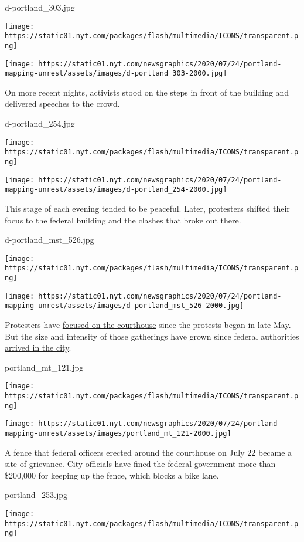 d-portland\_303.jpg

\texttt{[image: https://static01.nyt.com/packages/flash/multimedia/ICONS/transparent.png]}

\texttt{[image: https://static01.nyt.com/newsgraphics/2020/07/24/portland-mapping-unrest/assets/images/d-portland\_303-2000.jpg]}

On more recent nights, activists stood on the steps in front of the
building and delivered speeches to the crowd.

d-portland\_254.jpg

\texttt{[image: https://static01.nyt.com/packages/flash/multimedia/ICONS/transparent.png]}

\texttt{[image: https://static01.nyt.com/newsgraphics/2020/07/24/portland-mapping-unrest/assets/images/d-portland\_254-2000.jpg]}

This stage of each evening tended to be peaceful. Later, protesters
shifted their focus to the federal building and the clashes that broke
out there.

d-portland\_mst\_526.jpg

\texttt{[image: https://static01.nyt.com/packages/flash/multimedia/ICONS/transparent.png]}

\texttt{[image: https://static01.nyt.com/newsgraphics/2020/07/24/portland-mapping-unrest/assets/images/d-portland\_mst\_526-2000.jpg]}

Protesters have
\href{https://www.youtube.com/watch?v=s1FnOvg62O0}{focused on the
courthouse} since the protests began in late May. But the size and
intensity of those gatherings have grown since federal authorities
\href{https://www.nytimes.com/2020/07/17/us/portland-protests.html}{arrived
in the city}.

portland\_mt\_121.jpg

\texttt{[image: https://static01.nyt.com/packages/flash/multimedia/ICONS/transparent.png]}

\texttt{[image: https://static01.nyt.com/newsgraphics/2020/07/24/portland-mapping-unrest/assets/images/portland\_mt\_121-2000.jpg]}

A fence that federal officers erected around the courthouse on July 22
became a site of grievance. City officials have
\href{https://twitter.com/ChloeEudalyPDX/status/1288163839037456385}{fined
the federal government} more than \$200,000 for keeping up the fence,
which blocks a bike lane.

portland\_253.jpg

\texttt{[image: https://static01.nyt.com/packages/flash/multimedia/ICONS/transparent.png]}

